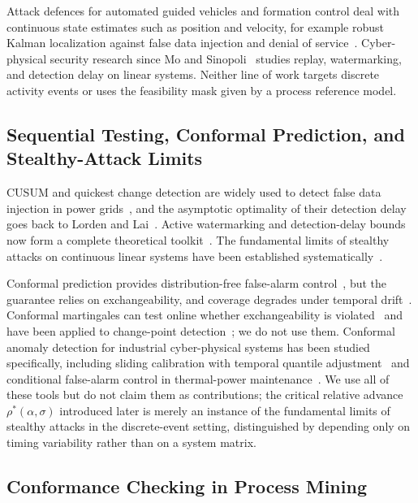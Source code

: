 \documentclass[manuscript,screen,review]{acmart}
\begin{document}
Attack defences for automated guided vehicles and formation control deal with continuous state estimates such as position and velocity, for example robust Kalman localization against false data injection and denial of service~\cite{elsisi2023agv}. Cyber-physical security research since Mo and Sinopoli~\cite{mo2009replay} studies replay, watermarking, and detection delay on linear systems. Neither line of work targets discrete activity events or uses the feasibility mask given by a process reference model.

\subsection{Sequential Testing, Conformal Prediction, and Stealthy-Attack Limits}
\label{sec:rw_tools}

{CUSUM} and quickest change detection are widely used to detect false data injection in power grids~\cite{li2015quickest}, and the asymptotic optimality of their detection delay goes back to {Lorden} and {Lai}~\cite{lorden1971procedures,lai1998information}. Active watermarking and detection-delay bounds now form a complete theoretical toolkit~\cite{naha2023watermark}. The fundamental limits of stealthy attacks on continuous linear systems have been established systematically~\cite{liu2022limits}.

Conformal prediction provides distribution-free false-alarm control~\cite{shafer2008conformal,angelopoulos2023conformal}, but the guarantee relies on exchangeability, and coverage degrades under temporal drift~\cite{barber2023exchangeability}. Conformal martingales can test online whether exchangeability is violated~\cite{vovk2003testing} and have been applied to change-point detection~\cite{volkhonskiy2017inductive}; we do not use them. Conformal anomaly detection for industrial cyber-physical systems has been studied specifically, including sliding calibration with temporal quantile adjustment~\cite{yuan2026conformal} and conditional false-alarm control in thermal-power maintenance~\cite{kundacina2025conformal}. We use all of these tools but do not claim them as contributions; the critical relative advance $\rho^*(\alpha,\sigma)$ introduced later is merely an instance of the fundamental limits of stealthy attacks in the discrete-event setting, distinguished by depending only on timing variability rather than on a system matrix.

\subsection{Conformance Checking in Process Mining}
\label{sec:rw_pm}
\end{document}
